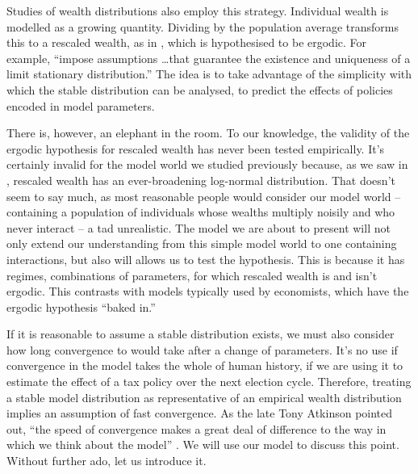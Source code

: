 Studies of wealth distributions also employ this strategy. Individual wealth is modelled as a growing quantity. Dividing by the population average transforms this to a rescaled wealth, as in , which is hypothesised to be ergodic. For example, \cite[p.~130]{BenhabibBisinZhu2011} ``impose assumptions \dots that guarantee the existence and uniqueness of a limit stationary distribution.'' The idea is to take advantage of the simplicity with which the stable distribution can be analysed, \eg to predict the effects of policies encoded in model parameters.

There is, however, an elephant in the room. To our knowledge, the validity of the ergodic hypothesis for rescaled wealth has never been tested empirically. It's certainly invalid for the \GBM model world we studied previously because, as we saw in , rescaled wealth has an ever-broadening log-normal distribution. That doesn't seem to say much, as most reasonable people would consider our model world -- containing a population of individuals whose wealths multiply noisily and who never interact -- a tad unrealistic. The model we are about to present will not only extend our understanding from this simple model world to one containing interactions, but also will allows us to test the hypothesis. This is because it has regimes, \ie combinations of parameters, for which rescaled wealth is and isn't ergodic. This contrasts with models typically used by economists, which have the ergodic hypothesis ``baked in.''

If it is reasonable to assume a stable distribution exists, we must also consider how long convergence to would take after a change of parameters. It's no use if convergence in the model takes the whole of human history, if we are using it to estimate the effect of a tax policy over the next election cycle. Therefore, treating a stable model distribution as representative of an empirical wealth distribution implies an assumption of fast convergence.  As the late Tony Atkinson pointed out, ``the speed of convergence makes a great deal of difference to the way in which we think about the model'' \cite{Atkinson1969}. We will use our model to discuss this point. Without further ado, let us introduce it.



